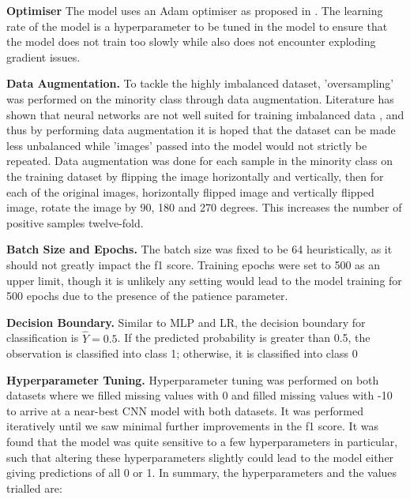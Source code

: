\documentclass[a4paper,11pt]{report}
\begin{document}
\textbf{Optimiser} 
The model uses an Adam optimiser as proposed in \citep{kingma2014adam}. The learning rate of the model is a hyperparameter to be tuned in the model to ensure that the model does not train too slowly while also does not encounter exploding gradient issues.

\textbf{Data Augmentation.}
To tackle the highly imbalanced dataset, 'oversampling' was performed on the minority class through data augmentation. Literature has shown that neural networks are not well suited for training imbalanced data \citep{raj2016towards}, and thus by performing data augmentation it is hoped that the dataset can be made less unbalanced while 'images' passed into the model would not strictly be repeated. Data augmentation was done for each sample in the minority class on the training dataset by flipping the image horizontally and vertically, then for each of the original images, horizontally flipped image and vertically flipped image, rotate the image by 90, 180 and 270 degrees. This increases the number of positive samples twelve-fold. 

\textbf{Batch Size and Epochs.} The batch size was fixed to be 64 heuristically, as it should not greatly impact the f1 score. Training epochs were set to 500 as an upper limit, though it is unlikely any setting would lead to the model training for 500 epochs due to the presence of the patience parameter. 

\textbf{Decision Boundary.} Similar to MLP and LR, the decision boundary for classification is $\hat{Y} = 0.5$. If the predicted probability is greater
than 0.5, the observation is classified into class 1; otherwise, it is classified into class 0

\textbf{Hyperparameter Tuning.} Hyperparameter tuning was performed on both datasets where we filled missing values with 0 and filled missing values with -10 to arrive at a near-best CNN model with both datasets. It was performed iteratively until we saw minimal further improvements in the f1 score. It was found that the model was quite sensitive to a few hyperparameters in particular, such that altering these hyperparameters slightly could lead to the model either giving predictions of all 0 or 1. In summary, the hyperparameters and the values trialled are: 
\end{document}
